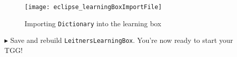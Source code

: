 \begin{itemize}
\vspace{0.5cm}

\begin{figure}[htbp]
\begin{center}
  \texttt{[image: eclipse\_learningBoxImportFile]}
  \caption{Importing \texttt{Dictionary} into the learning box}
  \label{eclipse:importConfigFile}
\end{center}
\end{figure}

\item[$\blacktriangleright$] Save and rebuild \texttt{LeitnersLearningBox}. You're now ready to start your TGG!

\end{itemize}
